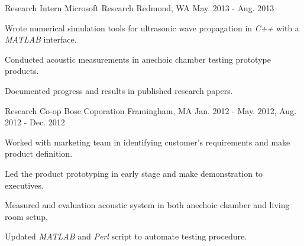 \begin{cventries}
  \cventry
    {Research Intern} %
    {Microsoft Research} %
    {Redmond, WA} %
    {May. 2013 - Aug. 2013} %
    {
      \begin{cvitems} %
        \item {Wrote numerical simulation tools for ultrasonic wave propagation in \textit{C++} with a \textit{MATLAB} interface.}
        \item {Conducted acoustic measurements in anechoic chamber testing prototype products.}
        \item {Documented progress and results in published research papers.}
      \end{cvitems}
    }

  \cventry
    {Research Co-op} %
    {Bose Coporation} %
    {Framingham, MA} %
    {Jan. 2012 - May. 2012, Aug. 2012 - Dec. 2012} %
    {
      \begin{cvitems} %
        \item {Worked with marketing team in identifying customer's requirements and make product definition.}
        \item {Led the product prototyping in early stage and make demonstration to executives.}
        \item {Measured and evaluation acoustic system in both anechoic chamber and living room setup.}
        \item {Updated \textit{MATLAB} and \textit{Perl} script to automate testing procedure.}
      \end{cvitems}
    }

\end{cventries}
